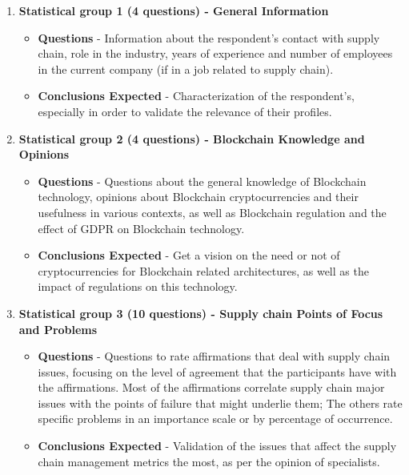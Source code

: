 \begin{enumerate}

\item \textbf{Statistical group 1 (4 questions) - General Information}
	\begin{itemize}
	\item \textbf{Questions} - Information about the respondent's contact with supply chain, role in the industry, years of experience and number of employees in the current company (if in a job related to supply chain).
    \item \textbf{Conclusions Expected} - Characterization of the respondent's, especially in order to validate the relevance of their profiles.
	\end{itemize}
    
\item \textbf{Statistical group 2 (4 questions) - Blockchain Knowledge and Opinions}
	\begin{itemize}
	\item \textbf{Questions} - Questions about the general knowledge of Blockchain technology, opinions about Blockchain cryptocurrencies and their usefulness in various contexts, as well as Blockchain regulation and the effect of GDPR on Blockchain technology.
    \item \textbf{Conclusions Expected} - Get a vision on the need or not of cryptocurrencies for Blockchain related architectures, as well as the impact of regulations on this technology.
	\end{itemize}
    
\item \textbf{Statistical group 3 (10 questions) - Supply chain Points of Focus and Problems}
	\begin{itemize}
    \item \textbf{Questions} - Questions to rate affirmations that deal with supply chain issues, focusing on the level of agreement that the participants have with the affirmations. Most of the affirmations correlate supply chain major issues with the points of failure that might underlie them; The others rate specific problems in an importance scale or by percentage of occurrence.
    \item \textbf{Conclusions Expected} - Validation of the issues that affect the supply chain management metrics the most, as per the opinion of specialists.
	\end{itemize}
    

\end{enumerate}
